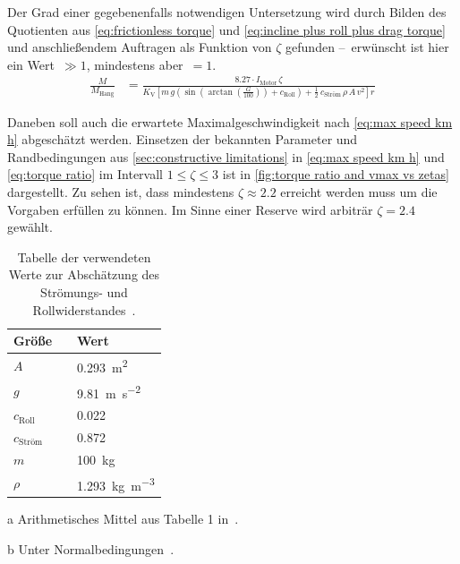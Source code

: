 		Der Grad einer gegebenenfalls notwendigen Untersetzung wird durch Bilden des Quotienten aus \cref{eq:frictionless torque} und \cref{eq:incline plus roll plus drag torque} und anschließendem Auftragen als Funktion von \(\zeta\) gefunden --~erwünscht ist hier ein Wert~\(\gg \num{1}\), mindestens aber~\(= \num{1}\).
		\begin{align}
			\frac{M}{M_\text{Hang}} &= \frac{\num{8,27} \cdot I_\text{Motor} \, \zeta}{K_\text{V}
			\left[ m \, g
				\left(\sin\!
					\left(\arctan\!
						\left(
							\frac{G}{100}
						\right)
					\right) + c_\text{Roll}
				\right) + \frac{1}{2} \, c_\text{Ström} \, \rho \, A \, v^2
			\right] r}%
			\label{eq:torque ratio}
		\end{align}

		Daneben soll auch die erwartete Maximalgeschwindigkeit nach \cref{eq:max speed km h} abgeschätzt werden.
		Einsetzen der bekannten Parameter und Randbedingungen aus \cref{sec:constructive limitations} in \cref{eq:max speed km h} und \cref{eq:torque ratio} im Intervall \(\num{1} \leq \zeta \leq \num{3}\) ist in \cref{fig:torque ratio and vmax vs zetas} dargestellt.
		Zu sehen ist, dass mindestens \(\zeta \approx \num{2,2}\) erreicht werden muss um die Vorgaben erfüllen zu können.
		Im Sinne einer Reserve wird arbiträr \(\zeta = \num{2,4}\) gewählt.
		\begin{table}[h]
			\caption[Tabelle der verwendeten Werte zur Abschätzung des Strömungs- und Rollwiderstandes]{Tabelle der verwendeten Werte zur Abschätzung des Strömungs- und Rollwiderstandes~\cites{GESTIS.Luft}{material.advances.skateboarding.WATERMAN1978}{air.drag.human.body.VANINGENSCHENAU1982}.}%
			\label{tab:drag roll values}
			\centering
			\begin{threeparttable}
				\begin{tabular}{lp{2cm}l}
					\toprule
					Größe								&& Wert\\ \midrule
					\(A\)\tnote{a}						&& \qty{0,293}{\metre\squared}\\
					\(g\)								&& \qty{9,81}{\metre\per\second\squared}\\
					\(c_\text{Roll}\)					&& \num{0,022}\\
					\(c_\text{Ström}\)\tnote{a}			&& \num{0,872}\\
					\(m\)								&& \qty{100}{\kilo\gram}\\
					\(\rho\)\tnote{b}					&& \qty{1,293}{\kilo\gram\per\metre\cubed}\\ \bottomrule
				\end{tabular}
				\begin{tablenotes}\footnotesize
					\item[a]	Arithmetisches Mittel aus Tabelle 1 in~\cite{air.drag.human.body.VANINGENSCHENAU1982}.
					\item[b]	Unter Normalbedingungen~\cite{GESTIS.Luft}.
				\end{tablenotes}
			\end{threeparttable}
		\end{table}
